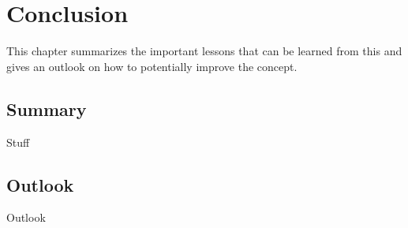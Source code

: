 
\chapter{Conclusion}\label{chapter:conclusion}

	This chapter summarizes the important lessons that can be learned from this and gives an outlook on how to potentially improve the concept.

	\section{Summary}
		Stuff
		
	
	\section{Outlook}
		
		Outlook